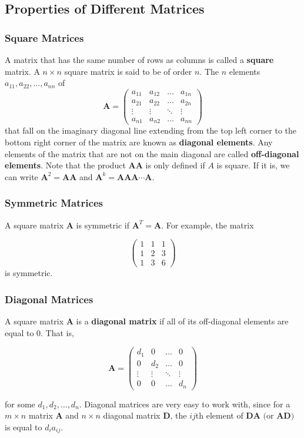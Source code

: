 \documentclass{beamer}
\begin{document}
\subsection{Properties of Different Matrices}

\begin{frame}
\frametitle{Square Matrices}
A matrix that has the same number of rows as columns is called a \textbf{square} matrix.  A $n \times n$ square matrix is said to be of order $n$.  The $n$ elements $a_{11}, a_{22}, \hdots, a_{nn}$ of
\[\mathbf{A} = 
\begin{pmatrix}
    a_{11} & a_{12} & \dots  & a_{1n} \\
    a_{21} & a_{22}  & \dots  & a_{2n} \\
    \vdots & \vdots  & \ddots & \vdots \\
    a_{n1} & a_{n2}  & \dots  & a_{nn}
\end{pmatrix}
\]
 that fall on the imaginary diagonal line extending from the top left corner to the bottom right corner of the matrix are known as \textbf{diagonal elements}.  Any elements of the matrix that are not on the main diagonal are called \textbf{off-diagonal elements}.  Note that the product $\mathbf{AA}$ is only defined if $A$ is square.  If it is, we can write $\mathbf{A}^2 = \mathbf{AA}$ and $\mathbf{A}^k = \mathbf{AAA\cdots A}$.
\end{frame}

\begin{frame}
\frametitle{Symmetric Matrices}
A square matrix $\mathbf{A}$ is symmetric if $\mathbf{A}^T = \mathbf{A}$.  For example, the matrix

\[\begin{pmatrix}
    1 & 1 & 1\\
    1 & 2 & 3 \\
    1 & 3 & 6   
\end{pmatrix}
\]
is symmetric.
\end{frame}

\begin{frame}
\frametitle{Diagonal Matrices}
A square matrix $\mathbf{A}$ is a \textbf{diagonal matrix} if all of its off-diagonal elements are equal to 0.  That is,

\[\mathbf{A} = 
\begin{pmatrix}
    d_{1} & 0 & \dots  & 0 \\
    0 & d_{2}  & \dots  & 0 \\
    \vdots & \vdots  & \ddots & \vdots \\
    0 & 0  & \dots  & d_{n}
\end{pmatrix}
\]

for some $d_1, d_2, \hdots, d_n$.  Diagonal matrices are very easy to work with, since for a $m \times n$ matrix $\mathbf{A}$ and $n \times n$ diagonal matrix $\mathbf{D}$, the $ij$th element of $\mathbf{DA} \text{ (or }\mathbf{AD})$ is equal to $d_i a_{ij}$.  
\end{frame}
\end{document}
